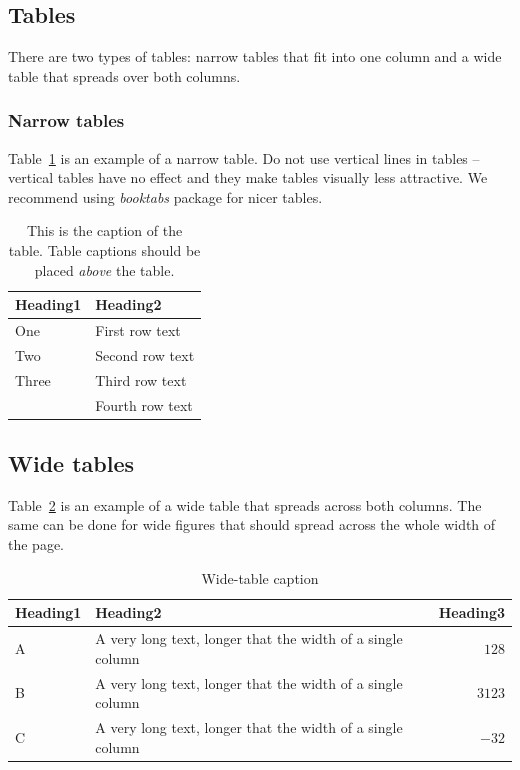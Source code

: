 \documentclass[10pt, a4paper]{article}
\begin{document}
\subsection{Tables}

There are two types of tables: narrow tables that fit into one column and a wide table that spreads over both columns.

\subsubsection{Narrow tables}

Table~\ref{tab:narrow-table} is an example of a narrow table. Do not use vertical lines in tables -- vertical tables have no effect and they make tables visually less attractive. We recommend using \textit{booktabs} package for nicer tables.

\begin{table}
\caption{This is the caption of the table. Table captions should be placed \textit{above} the table.}
\label{tab:narrow-table}
\begin{center}
\begin{tabular}{ll}
\toprule
Heading1 & Heading2 \\
\midrule
One & First row text \\
Two   & Second row text \\
Three   & Third row text \\
      & Fourth row text \\
\bottomrule
\end{tabular}
\end{center}
\end{table}

\subsection{Wide tables}

Table~\ref{tab:wide-table} is an example of a wide table that spreads across both columns. The same can be done for wide figures that should spread across the whole width of the page. 

\begin{table}
\caption{Wide-table caption}
\label{tab:wide-table}
\begin{center}
\begin{tabular}{llr}
\toprule
Heading1 & Heading2 & Heading3\\
\midrule
A & A very long text, longer that the width of a single column & $128$\\
B & A very long text, longer that the width of a single column & $3123$\\
C & A very long text, longer that the width of a single column & $-32$\\
\bottomrule
\end{tabular}
\end{center}
\end{table}
\end{document}
